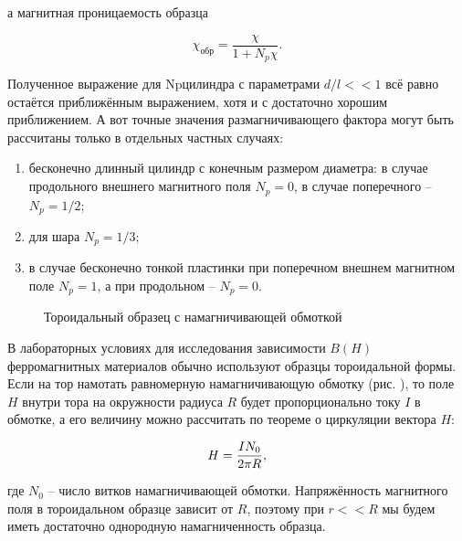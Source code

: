 а  магнитная проницаемость образца

\begin{equation*}
	\chi_{\text{обр}} = \frac{\chi}{1 + N_p \chi}.
\end{equation*}


Полученное выражение для Npцилиндра с параметрами $d/l << 1$ всё равно остаётся приближённым выражением, хотя и с достаточно хорошим приближением. А вот точные значения размагничивающего фактора могут быть рассчитаны только в отдельных частных случаях:
\begin{enumerate}
	\item бесконечно длинный цилиндр с конечным размером диаметра: 
в случае продольного внешнего магнитного поля $N_p = 0$, в случае 
поперечного -- $N_p = 1/2$;
	\item для шара $ N_p = 1/3$;
	\item в случае бесконечно тонкой пластинки при поперечном внешнем магнитном поле $N_p = 1$, а при продольном -- $N_p = 0$.
\end{enumerate}


\begin{wrapfigure}{r}{0.4\textwidth}
	\caption{Тороидальный образец с намагничивающей обмоткой}
	\figmark[toroid]
\end{wrapfigure}

В лабораторных условиях для исследования зависимости $B(H)$ ферромагнитных материалов обычно используют образцы тороидальной формы. Если на тор намотать равномерную намагничивающую обмотку (рис. ), то поле $H$ внутри тора на окружности радиуса $R$ будет пропорционально току $I$ в обмотке, а его величину можно рассчитать по теореме о циркуляции вектора $H$:

\begin{equation}
	\eqmark[H-toroid]
	H = \frac{IN_0}{2\pi R},
\end{equation}

где $N_0$ -- число витков намагничивающей обмотки. Напряжённость магнитного поля в тороидальном образце зависит от $R$, поэтому при $r<<R$ мы будем иметь достаточно однородную намагниченность образца.

